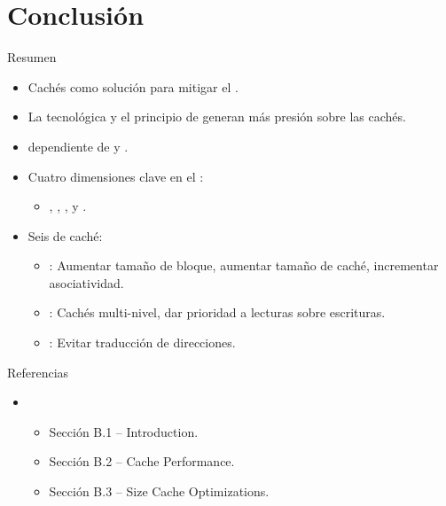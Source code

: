 \section{Conclusión}

\begin{frame}[t,shrink=10]{Resumen}
\begin{itemize}

  \item Cachés como solución para mitigar el .

  \item La  tecnológica y el principio de 
        generan más presión sobre las cachés.
  
  \item {} dependiente de 
        y .

  \item Cuatro dimensiones clave en el :
    \begin{itemize}
      \item 
        , 
        ,
        , y
        .
    \end{itemize}

  \item Seis  de caché:
    \begin{itemize}
      \item {}: 
        Aumentar tamaño de bloque,
        aumentar tamaño de caché,
        incrementar asociatividad.
      \item {}:
        Cachés multi-nivel,
        dar prioridad a lecturas sobre escrituras.
      \item {}:
        Evitar traducción de direcciones.
    \end{itemize}
\end{itemize}
\end{frame}


\begin{frame}[t]{Referencias}
\begin{itemize}
  \item \bibhennessy
    \begin{itemize}
       \item Sección B.1 -- Introduction.
       \item Sección B.2 -- Cache Performance.
       \item Sección B.3 -- Size Cache Optimizations.
    \end{itemize}
\end{itemize}
\end{frame}
